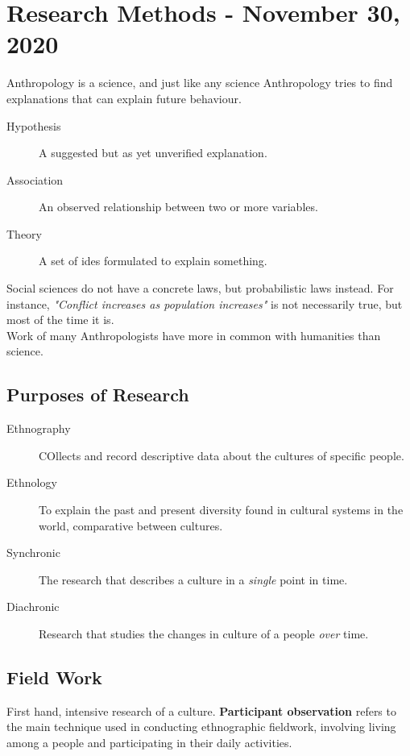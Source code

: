 \documentclass[11pt,a4paper]{book}
\begin{document}
\chapter{Research Methods - November 30, 2020}

Anthropology is a science, and just like any science Anthropology tries to find explanations that can explain future behaviour.

\begin{description}
\item[Hypothesis] A suggested but as yet unverified explanation.
\item[Association] An observed relationship between two or more variables.
\item[Theory] A set of ides formulated to explain something.
\end{description}

Social sciences do not have a concrete laws, but probabilistic laws instead. For instance, \textit{"Conflict increases as population increases"} is not necessarily true, but most of the time it is.\\

Work of many Anthropologists have more in common with humanities than science.

\section{Purposes of Research}

\begin{description}
\item[Ethnography] COllects and record descriptive data about the cultures of specific people.
\item[Ethnology] To explain the past and present diversity found in cultural systems in the world, comparative between cultures.
\item[Synchronic] The research that describes a culture in a \textit{single} point in time.
\item[Diachronic] Research that studies the changes in culture of a people \textit{over} time.
\end{description}

\section{Field Work}

First hand, intensive research of a culture. \textbf{Participant observation} refers to the main technique used in conducting ethnographic fieldwork, involving living among a people and participating in their daily activities.\\
\end{document}
